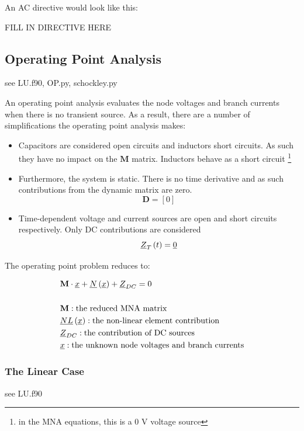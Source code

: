 An AC directive would look like this:

FILL IN DIRECTIVE HERE

\subsection{Operating Point Analysis}

see LU.f90, OP.py, schockley.py

An operating point analysis evaluates the node voltages and branch currents when there is no transient source. As a result, there are a number of simplifications the operating point analysis makes:

\begin{itemize}
    \item Capacitors are considered open circuits and inductors short circuits. As such they have no impact on the $\mathbf{M}$ matrix. Inductors behave as a short circuit \footnote{in the MNA equations, this is a 0 V voltage source}
    \item Furthermore, the system is static. There is no time derivative and as such contributions from the dynamic matrix are zero. \[\mathbf{D} = [0] \]
    \item Time-dependent voltage and current sources are open and short circuits respectively. Only DC contributions are considered \[ \underline{Z}_{T}\left( t\right) = \underline{0}\]
\end{itemize}

The operating point problem reduces to:

\begin{align*}
    &\mathbf{M}\cdot \underline{x} + \underline{N}\left(\underline{x} \right) + \underline{Z}_{DC} = 0 \label{eq:op problem}\\\\
    &\mathbf{M}: \text{the reduced MNA matrix}\\
    &\underline{NL}\left(\underline{x} \right): \text{the non-linear element contribution}\\
    &\underline{Z}_{DC}: \text{the contribution of DC sources}\\
    &\underline{x}: \text{the unknown node voltages and branch currents}
\end{align*}

\subsubsection{The Linear Case}

see LU.f90

